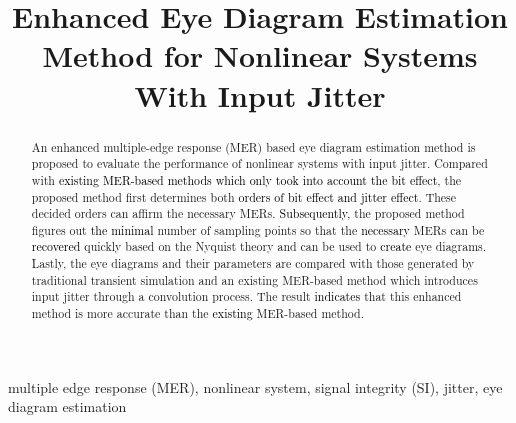 \documentclass[conference]{IEEEtran}
\begin{document}
\title{Enhanced Eye Diagram Estimation Method for Nonlinear Systems With Input Jitter}

\author{


\and


}

\maketitle

\begin{abstract}
An enhanced multiple-edge response (MER) based eye diagram estimation method is proposed to evaluate the performance of nonlinear systems with input jitter. Compared with \textcolor{black}{existing MER-based methods} \textcolor{black}{which only took into account the bit effect}, the proposed method first determines both \textcolor{black}{orders of bit effect and jitter effect}.
\color{black}
These decided orders can affirm the necessary MERs.
\color{black}
\textcolor{black}{Subsequently}, the proposed method figures out \textcolor{black}{the minimal} number of sampling points so that the \textcolor{black}{necessary} MERs can be \textcolor{black}{recovered} quickly based on the Nyquist theory and can be used to \textcolor{black}{create} eye diagrams.
\color{black}
Lastly, the eye diagrams and their parameters are compared with those generated by traditional transient simulation and an existing MER-based method which introduces input jitter through a convolution process.
\color{black}
The result \textcolor{black}{indicates} that this enhanced method is more accurate than the \textcolor{black}{existing} MER-based method.
\end{abstract}

\begin{IEEEkeywords}
multiple edge response (MER), nonlinear system, signal integrity (SI), jitter, eye diagram estimation
\end{IEEEkeywords}
\end{document}
